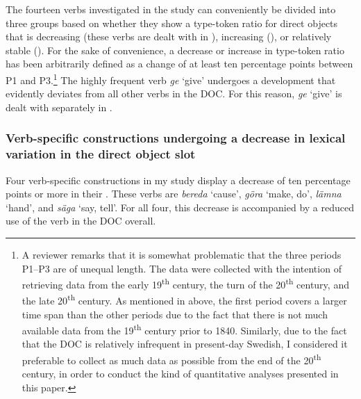 \documentclass[output=paper]{langscibook}
\begin{document}
The fourteen verbs investigated in the study can conveniently be divided into three groups based on whether they show a type-token ratio for direct objects that is decreasing (these verbs are dealt with in ), increasing (), or relatively stable (). For the sake of convenience, a decrease or increase in type-token ratio has been arbitrarily defined as a change of at least ten percentage points between P1 and P3.\footnote{A reviewer remarks that it is somewhat problematic that the three periods P1–P3 are of unequal length. The data were collected with the intention of retrieving data from the early 19\textsuperscript{th} century, the turn of the 20\textsuperscript{th} century, and the late 20\textsuperscript{th} century. As mentioned in  above, the first period covers a larger time span than the other periods due to the fact that there is not much available data from the 19\textsuperscript{th} century prior to 1840. Similarly, due to the fact that the DOC is relatively infrequent in present-day Swedish, I considered it preferable to collect as much data as possible from the end of the 20\textsuperscript{th} century, in order to conduct the kind of quantitative analyses presented in this paper.}  The highly frequent verb \textit{ge} ‘give’ undergoes a development that evidently deviates from all other verbs in the DOC. For this reason, \textit{ge} ‘give’ is dealt with separately in .


\subsubsection{Verb-specific constructions undergoing a decrease in lexical variation in the direct object slot}\label{sec:valdeson:5.3.1}


Four verb-specific constructions in my study display a decrease of ten percentage points or more in their . These verbs are \textit{bereda} ‘cause’, \textit{göra} ‘make, do’, \textit{lämna} ‘hand’, and \textit{säga} ‘say, tell’. For all four, this decrease is accompanied by a reduced use of the verb in the DOC overall.



\label{sec:valdeson:5.3.1.1}
\end{document}
